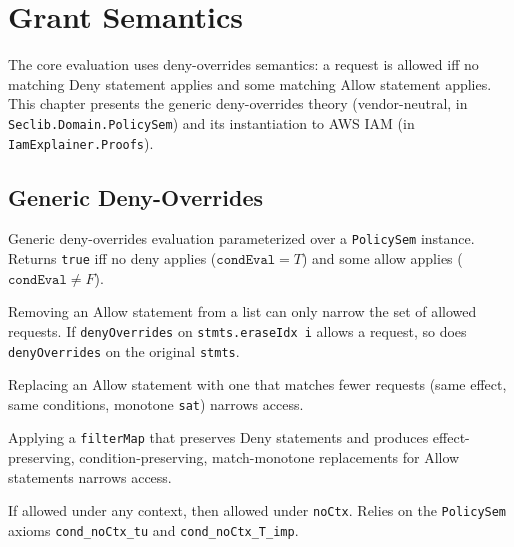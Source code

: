 \chapter{Grant Semantics}\label{chap:grants}

The core evaluation uses deny-overrides semantics: a request is allowed
iff no matching Deny statement applies and some matching Allow statement
applies.  This chapter presents the generic deny-overrides theory
(vendor-neutral, in \texttt{Seclib.Domain.PolicySem}) and its
instantiation to AWS IAM (in \texttt{IamExplainer.Proofs}).

\section{Generic Deny-Overrides}

\begin{definition}[denyOverrides]\label{def:denyOverrides}
\leanok
Generic deny-overrides evaluation parameterized over a \texttt{PolicySem}
instance.  Returns \texttt{true} iff no deny applies ($\texttt{condEval} = T$)
and some allow applies ($\texttt{condEval} \neq F$).
\end{definition}

\begin{theorem}[removeAllow]\label{thm:removeAllow}
\leanok
Removing an Allow statement from a list can only narrow the set of
allowed requests.  If \texttt{denyOverrides} on
\texttt{stmts.eraseIdx i} allows a request, so does \texttt{denyOverrides}
on the original \texttt{stmts}.
\end{theorem}

\begin{theorem}\label{thm:narrow_narrows}
\leanok
Replacing an Allow statement with one that matches fewer requests
(same effect, same conditions, monotone \texttt{sat}) narrows access.
\end{theorem}

\begin{theorem}\label{thm:filterMap_narrows}
\leanok
Applying a \texttt{filterMap} that preserves Deny statements and
produces effect-preserving, condition-preserving, match-monotone
replacements for Allow statements narrows access.
\end{theorem}

\begin{theorem}\label{thm:nocontext_conservative}
\leanok
If allowed under any context, then allowed under \texttt{noCtx}.
Relies on the \texttt{PolicySem} axioms \texttt{cond\_noCtx\_tu}
and \texttt{cond\_noCtx\_T\_imp}.
\end{theorem}

